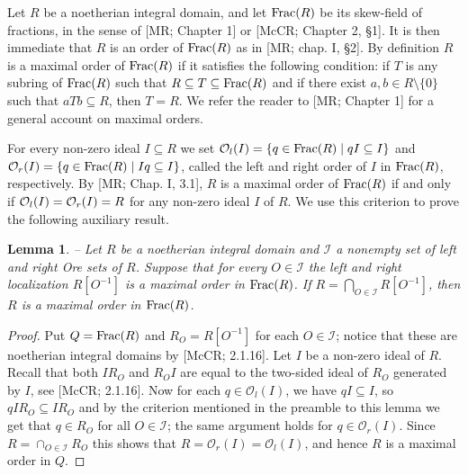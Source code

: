 \documentclass[twoside,11pt]{article}
\newcommand{\Frac}{{\rm Frac}}
\renewcommand{\O}{{\mathcal O}}
\newcommand{\I}{{\mathcal I}}
\newtheorem{sublemma}[subtheorem]{Lemma}
\begin{document}
Let $R$ be a noetherian integral domain, and let $\Frac(R)$ be its skew-field of
fractions, in the sense of [MR; Chapter 1] or [McCR; Chapter 2, \S 1]. It is then
immediate that $R$ is an order of $\Frac(R)$ as in [MR; chap. I, \S 2]. By definition $R$
is a maximal order of $\Frac(R)$ if it satisfies the following condition: if $T$ is any
subring of $\Frac(R)$ such that $R \subseteq T \subseteq \Frac(R)$ and if there exist $a,b
\in R \setminus \{0\}$ such that $aTb \subseteq R$, then $T = R$. We refer the reader to
[MR; Chapter 1] for a general account on maximal orders. 

For every non-zero ideal $I \subseteq R$ we set ${\cal O}_{l}(I) = \{q \in \Frac(R) \mid qI
\subseteq I \}$ and ${\cal O}_{r}(I) = \{q \in \Frac(R) \mid Iq \subseteq I \}$, called
the left and right order of $I$ in $\Frac(R)$, respectively. By [MR; Chap. I, 3.1], $R$ is
a maximal order of $\Frac(R)$ if and only if ${\cal O}_{l}(I) = {\cal O}_{r}(I) = R$ for
any non-zero ideal $I$ of $R$. We use this criterion to prove the following auxiliary
result.
\begin{sublemma} -- \label{lemme-OM}
	Let $R$ be a noetherian integral domain and $\I$ a nonempty set of left and right
	Ore sets of $R$. Suppose that for every $O \in \I$ the left and right localization
	$R[O^{-1}]$ is a maximal order in $\Frac(R)$. If $R = \bigcap_{O \in \I}
	R[O^{-1}]$, then $R$ is a maximal order in $\Frac(R)$.
\end{sublemma}

\begin{proof} Put $Q=\Frac(R)$ and $R_O=R[O^{-1}]$ for each $O \in \I$; notice that these
are noetherian integral domains by [McCR; 2.1.16]. Let $I$ be a non-zero ideal of $R$.
Recall that both $IR_O$ and $R_OI$ are equal to the two-sided ideal of $R_O$ generated by
$I$, see [McCR; 2.1.16]. Now for each $q \in \O_l(I)$, we have $qI
\subseteq I$, so $qIR_O \subseteq IR_O$ and by the criterion mentioned in the preamble to
this lemma we get that
$q \in R_O$ for all $O\in\I$; the same argument holds for $q \in \O_r(I)$. Since $R =
\cap_{O\in\I} R_O$ this shows that $R=\O_r(I)=\O_l(I)$, and hence $R$ is a maximal order
in $Q$.
\end{proof} 
\end{document}
